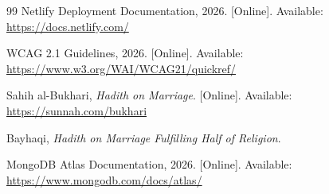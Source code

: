 \documentclass[conference]{IEEEtran}
\begin{document}
\begin{thebibliography}{99}
Netlify Deployment Documentation, 2026. [Online]. Available: \url{https://docs.netlify.com/}

WCAG 2.1 Guidelines, 2026. [Online]. Available: \url{https://www.w3.org/WAI/WCAG21/quickref/}

Sahih al-Bukhari, \textit{Hadith on Marriage}. [Online]. Available: \url{https://sunnah.com/bukhari}

Bayhaqi, \textit{Hadith on Marriage Fulfilling Half of Religion}.

MongoDB Atlas Documentation, 2026. [Online]. Available: \url{https://www.mongodb.com/docs/atlas/}
\end{thebibliography}
\end{document}
